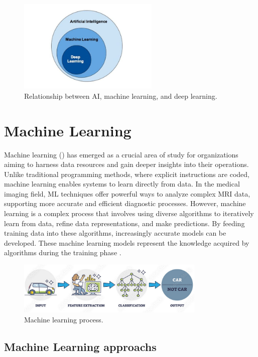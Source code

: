 \begin{figure}[H]
  \centering
  \includegraphics[width=0.6\textwidth]{Images/Chapter1/ai.jpg}
  \caption{Relationship between AI, machine learning, and deep learning.}
  \label{fig:ai}
\end{figure}

\section{Machine Learning}
\label{sec:ml}
Machine learning () has emerged as a crucial area of study for organizations aiming to harness data resources and gain deeper insights into their operations. Unlike traditional programming methods, where explicit instructions are coded, machine learning enables systems to learn directly from data. In the medical imaging field, ML techniques offer powerful ways to analyze complex MRI data, supporting more accurate and efficient diagnostic processes. However, machine learning is a complex process that involves using diverse algorithms to iteratively learn from data, refine data representations, and make predictions. By feeding training data into these algorithms, increasingly accurate models can be developed. These machine learning models represent the knowledge acquired by algorithms during the training phase \cite{hurwitz2018mlfd}.

\begin{figure}[H]
  \centering
  \includegraphics[width=0.8\textwidth]{Images/Chapter1/ml.png}
  \caption{Machine learning process.}
  \label{fig:ml}
\end{figure}
\subsection{Machine Learning approachs}
